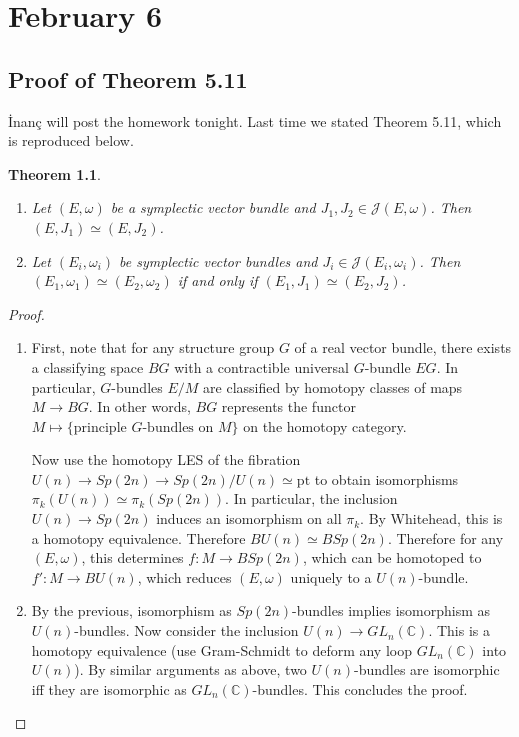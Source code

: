 \documentclass[leqno, openany]{memoir}
\theoremstyle{definition}
\theoremstyle{remark}
\theoremstyle{plain}
\newtheorem*{thm*}{Theorem}
\theoremstyle{definition}
\theoremstyle{remark}
\newcommand{\C}{\mathbb{C}}
\newcommand{\mc}[1]{\mathcal{#1}}
\newcommand{\mr}[1]{\mathrm{#1}}
\begin{document}
\chapter{February 6}%
\label{cha:february_6}

\section{Proof of Theorem 5.11}%
\label{sec:proof_of_theorem_5_11}


\.Inan\c{c} will post the homework tonight. Last time we stated Theorem 5.11, which is reproduced below.

\begin{thm*}
    \begin{enumerate}
        \item Let $(E, \omega)$ be a symplectic vector bundle and $J_1, J_2 \in \mc{J}(E, \omega)$. Then $(E, J_1) \simeq (E, J_2)$.
        \item Let $(E_i, \omega_i)$ be symplectic vector bundles and $J_i \in \mc{J}(E_i, \omega_i)$. Then $(E_1, \omega_1) \simeq (E_2, \omega_2)$ if and only if $(E_1, J_1) \simeq (E_2, J_2)$.
    \end{enumerate}
\end{thm*}

\begin{proof}
    \begin{enumerate}
        \item First, note that for any structure group $G$ of a real vector bundle, there exists a classifying space $BG$ with a contractible universal $G$-bundle $EG$. In particular, $G$-bundles $E/M$ are classified by homotopy classes of maps $M \to BG$. In other words, $BG$ represents the functor $M \mapsto \{ \text{principle } G\text{-bundles on }M \}$ on the homotopy category.

            Now use the homotopy LES of the fibration $U(n) \to Sp(2n) \to Sp(2n)/U(n) \simeq \mr{pt}$ to obtain isomorphisms $\pi_k(U(n)) \simeq \pi_k(Sp(2n))$. In particular, the inclusion $U(n) \to Sp(2n)$ induces an isomorphism on all $\pi_k$. By Whitehead, this is a homotopy equivalence. Therefore $BU(n) \simeq BSp(2n)$. Therefore for any $(E,\omega)$, this determines $f: M \to BSp(2n)$, which can be homotoped to $f': M \to BU(n)$, which reduces $(E, \omega)$ uniquely to a $U(n)$-bundle.
        \item By the previous, isomorphism as $Sp(2n)$-bundles implies isomorphism as $U(n)$-bundles. Now consider the inclusion $U(n) \to GL_n(\C)$. This is a homotopy equivalence (use Gram-Schmidt to deform any loop $GL_n(\C)$ into $U(n)$). By similar arguments as above, two $U(n)$-bundles are isomorphic iff they are isomorphic as $GL_n(\C)$-bundles. This concludes the proof. \qedhere
    \end{enumerate}
\end{proof}
\end{document}
